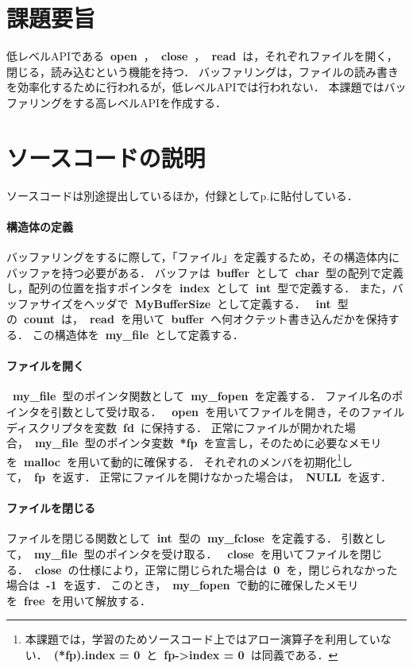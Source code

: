 \documentclass[12pt]{jlreq}
\renewcommand{\texttt}[1]{{\ttfamily\bfseries\ #1\ }}
\begin{document}
\section*{課題要旨}
低レベルAPIである\texttt{open}，\texttt{close}，\texttt{read}は，それぞれファイルを開く，閉じる，読み込むという機能を持つ．
バッファリングは，ファイルの読み書きを効率化するために行われるが，低レベルAPIでは行われない．
本課題ではバッファリングをする高レベルAPIを作成する．

\section*{ソースコードの説明}
ソースコードは別途提出しているほか，付録としてp.\pageref{apendix}に貼付している．
\paragraph{構造体の定義}
バッファリングをするに際して，「ファイル」を定義するため，その構造体内にバッファを持つ必要がある．
バッファは\texttt{buffer}として\texttt{char}型の配列で定義し，配列の位置を指すポインタを\texttt{index}として\texttt{int}型で定義する．
また，バッファサイズをヘッダで\texttt{MyBufferSize}として定義する．
\texttt{int}型の\texttt{count}は，\texttt{read}を用いて\texttt{buffer}へ何オクテット書き込んだかを保持する．
この構造体を\texttt{my\_file}として定義する．

\paragraph{ファイルを開く}
\texttt{my\_file}型のポインタ関数として\texttt{my\_fopen}を定義する．
ファイル名のポインタを引数として受け取る．
\texttt{open}を用いてファイルを開き，そのファイルディスクリプタを変数\texttt{fd}に保持する．
正常にファイルが開かれた場合，\texttt{my\_file}型のポインタ変数\texttt{*fp}を宣言し，そのために必要なメモリを\texttt{malloc}を用いて動的に確保する．
それぞれのメンバを初期化\footnote{本課題では，学習のためソースコード上ではアロー演算子を利用していない．\texttt{(*fp).index = 0}と\texttt{fp->index = 0}は同義である．}して，\texttt{fp}を返す．
正常にファイルを開けなかった場合は，\texttt{NULL}を返す．

\paragraph{ファイルを閉じる}
ファイルを閉じる関数として\texttt{int}型の\texttt{my\_fclose}を定義する．
引数として，\texttt{my\_file}型のポインタを受け取る．
\texttt{close}を用いてファイルを閉じる．\texttt{close}の仕様により，正常に閉じられた場合は\texttt{0}を，閉じられなかった場合は\texttt{-1}を返す．
このとき，\texttt{my\_fopen}で動的に確保したメモリを\texttt{free}を用いて解放する．
\end{document}
